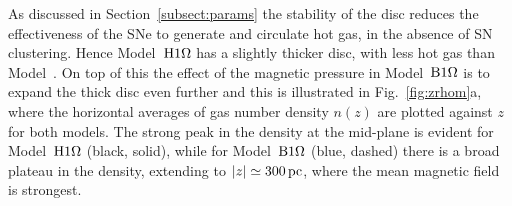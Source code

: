 \documentclass[useAMS,usenatbib]{mn2e}
\begin{document}
  As discussed in Section~\ref{subsect:params} the stability of the disc
  reduces the effectiveness of the SNe to generate and circulate hot gas, in
  the absence of SN clustering. 
  Hence Model~${\mathrm{H}1\rm{\Omega}}$ has a slightly thicker disc, with less hot gas than 
  Model~\Op.
  On top of this the effect of the magnetic pressure in Model~${\mathrm{B}1\rm{\Omega} }$ is to 
  expand the thick disc even further and this is illustrated in 
  Fig.~\ref{fig:zrhom}a, where the horizontal averages of gas number density
  $n(z)$ are plotted against $z$ for both models. 
  The strong peak in the density at the mid-plane is evident for Model~${\mathrm{H}1\rm{\Omega}}$
  (black, solid), while for Model~${\mathrm{B}1\rm{\Omega} }$ (blue, dashed) there is a broad
  plateau in the density, extending to $|z|\simeq300\,{\rm pc}$, where the mean 
  magnetic field is strongest.
  
\end{document}
